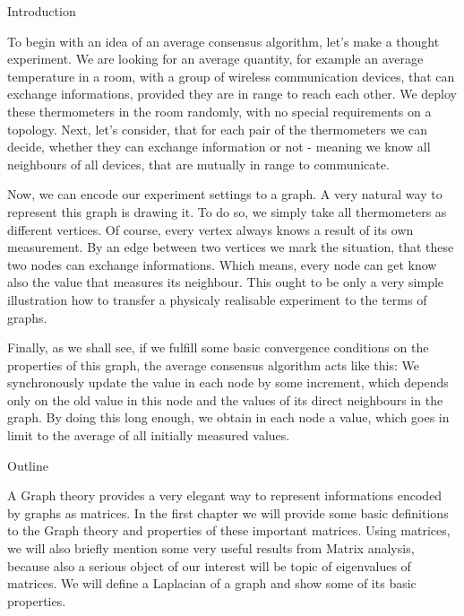 
\def\ctustyle{{\tenss CTUstyle}}
\def\ttb{\tt\char`\\} %

\chap Introduction


To begin with an idea of an average consensus algorithm, let's make a thought experiment. We are looking for an average quantity, for example an average temperature in a room, with a group of wireless communication devices, that can exchange informations, provided they are in range to reach each other. We deploy these thermometers in the room randomly, with no special requirements on a topology. Next, let's consider, that for each pair of the thermometers we can decide, whether they can exchange information or not - meaning we know all neighbours of all devices, that are mutually in range to communicate. 

Now, we can encode our experiment settings to a graph. A very natural way to represent this graph is drawing it. To do so, we simply take all thermometers as different vertices. Of course, every vertex always knows a result of its own measurement. By an edge between two vertices we mark the situation, that these two nodes can exchange informations. Which means, every node can get know also the value that measures its neighbour. This ought to be only a very simple illustration how to transfer a physicaly realisable experiment  to the terms of graphs.

 Finally, as we shall see, if we fulfill some basic convergence conditions on the properties of this graph, the average consensus algorithm acts like this: We synchronously update the value in each node by some increment, which depends only on the old value in this node and the values of its direct neighbours in the graph. By doing this long enough, we obtain in each node a value, which goes in limit to the average of  all initially measured values.

\sec Outline


 A Graph theory provides a very elegant way to represent informations encoded by graphs as matrices. In the first chapter we will provide some basic definitions to the Graph theory and properties of these important matrices. Using matrices, we will also briefly mention some very useful results from Matrix analysis, because also a serious object of our interest will be topic of eigenvalues of matrices. We will define a Laplacian of a graph and show some of its basic properties.

